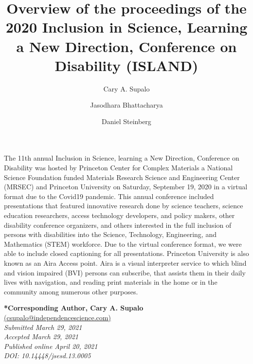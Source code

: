 \documentclass[11.5pt]{sig-alternate}
\begin{document}
\title{Overview of the proceedings of the 2020 Inclusion in
Science, Learning a New Direction, Conference on
Disability (ISLAND)}

\author[1]{\large \color{blue}Cary A. Supalo}
\author[1]{\large \color{blue}Jasodhara Bhattacharya}
\author[1]{\large \color{blue}Daniel Steinberg}


\toappear{}
\maketitle

\begin{large}
    

 The 11th annual Inclusion in Science, learning a New Direction, Conference on Disability was hosted by Princeton Center for Complex Materials a National Science Foundation funded Materials Research Science and Engineering Center (MRSEC) and Princeton University on Saturday, September 19, 2020 in a virtual format due to the Covid19 pandemic. This annual conference included presentations that featured innovative research done by science teachers, science education researchers, access technology developers, and policy makers, other disability conference organizers, and others interested in the full inclusion of persons with disabilities into the Science, Technology, Engineering, and Mathematics (STEM) workforce. Due to the virtual conference format, we were able to include closed captioning for all presentations. Princeton University is also known as an Aira Access point. Aira is a visual interpreter service to which blind and vision impaired (BVI) persons can subscribe, that assists them in their daily lives with navigation, and reading print materials in the home or in the community among numerous other purposes. 
 \end{large}
 
 \textbf{*Corresponding Author, Cary A. Supalo }\\
\href{mailto:csupalo@independencescience.com}{(csupalo@independencescience.com)} \\
\textit{Submitted  March 29, 2021}\\
\textit{Accepted March 29, 2021} \\
\textit{Published online April 20, 2021 } \\
\textit{DOI: 10.14448/jsesd.13.0005} \\
\end{document}
